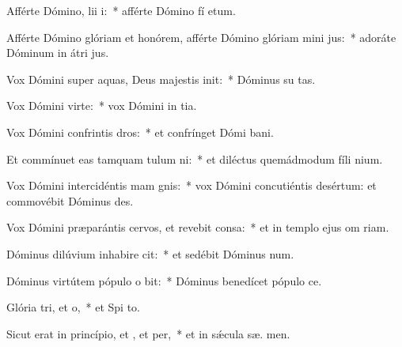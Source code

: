 \item Afférte Dómino, lii i:~* afférte Dómino fí etum.
\item Afférte Dómino glóriam et honórem, afférte Dómino glóriam mini jus:~* adoráte Dóminum in átri  jus.
\item Vox Dómini super aquas, Deus majestis init:~* Dóminus su  tas.
\item Vox Dómini  virte:~* vox Dómini in tia.
\item Vox Dómini confrintis dros:~* et confrínget Dómi  bani.
\item Et commínuet eas tamquam tulum ni:~* et diléctus quemádmodum fíli nium.
\item Vox Dómini intercidéntis mam gnis:~* vox Dómini concutiéntis desértum: et commovébit Dóminus  des.
\item Vox Dómini præparántis cervos, et revebit consa:~* et in templo ejus om  riam.
\item Dóminus dilúvium inhabire cit:~* et sedébit Dóminus   num.
\item Dóminus virtútem pópulo o bit:~* Dóminus benedícet pópulo   ce.
\item Glória tri, et o,~* et Spi to.
\item Sicut erat in princípio, et , et per,~* et in sǽcula sæ. men.
